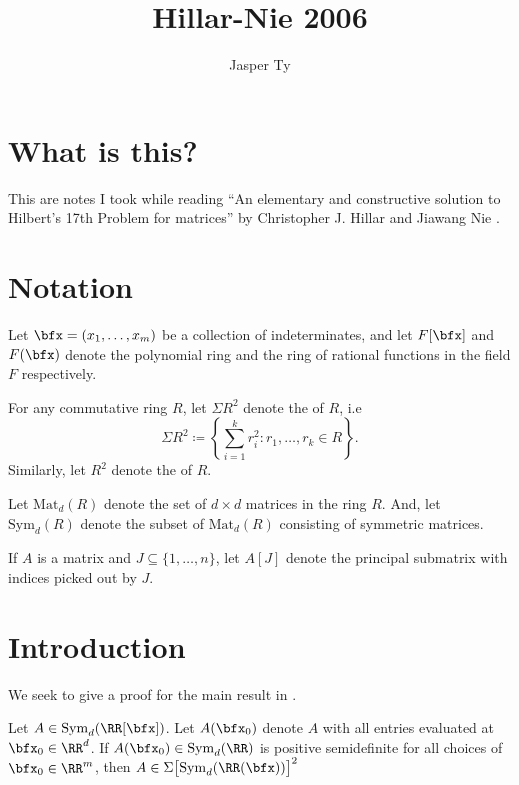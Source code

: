 \documentclass{article}
\title{Hillar-Nie 2006}
\author{Jasper Ty}
\date{}
\newcommand*\Mat{\mathrm{Mat}}
\newcommand*\Sym{\mathrm{Sym}}
\begin{document}
\maketitle

\section*{What is this?}

This are notes I took while reading ``An elementary and constructive solution to Hilbert's 17th Problem for matrices'' by Christopher J. Hillar and Jiawang Nie \cite{HN06}.

\tableofcontents

\section*{Notation}

Let $\bfx = (x_1,\ldots,x_m)$ be a collection of indeterminates, and let $F[\bfx]$ and $F(\bfx)$ denote the polynomial ring and the ring of rational functions in the field $F$ respectively.

For any commutative ring $R$, let $\Sigma R^2$ denote the  of $R$, i.e
\[
    \Sigma R^2
    \coloneq
    \left\{
        \sum_{i=1}^k r_i^2: r_1,\ldots,r_k \in R
    \right\}.
\]
Similarly, let $R^2$ denote the  of $R$.

Let $\Mat_d(R)$ denote the set of $d \times d$ matrices in the ring $R$. And, let $\Sym_d(R)$ denote the subset of $\Mat_d(R)$ consisting of symmetric matrices.

If $A$ is a matrix and $J \subseteq \{1,\ldots,n\}$, let $A[J]$ denote the principal submatrix with indices picked out by $J$.

\section{Introduction}

We seek to give a proof for the main result in \cite{HN06}.

\begin{theorem}
    \label{thm:1} 
    Let $A \in \Sym_d(\RR[\bfx])$.
    Let $A(\bfx_0)$ denote $A$ with all entries evaluated at $\bfx_0 \in \RR^d$.
    If $A(\bfx_0) \in \Sym_d(\RR)$ is positive semidefinite for all choices of $\bfx_0 \in \RR^m$, then $A \in \Sigma \big[\Sym_d(\RR(\bfx))\big]^2$
\end{theorem}
\end{document}
